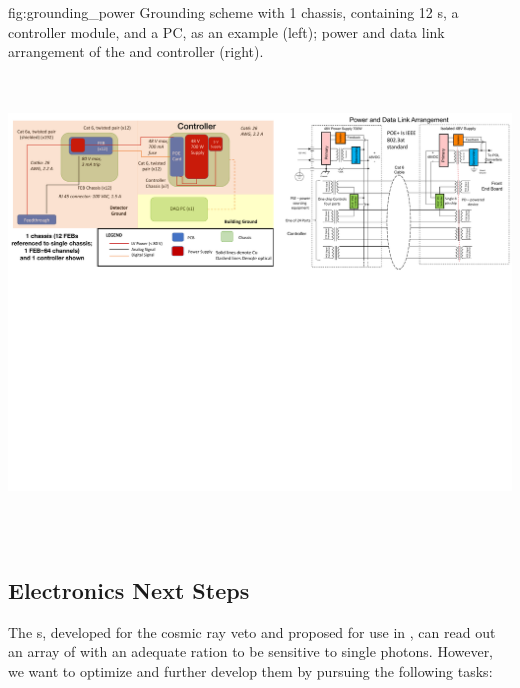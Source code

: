 \begin{dunefigure}
 {fig:grounding_power}
 {Grounding scheme with 1 chassis, containing 12 s, a controller module, and a  PC, as an example (left); power and data link arrangement of the  and controller (right).}
\includegraphics[height=5.0in]{graphics/pds-grounding-power.pdf} 
\vspace{-7.1cm}
\end{dunefigure}

\subsection{Electronics Next Steps}
\label{subsec:pds-fe-next}


The s, developed for the  cosmic ray veto and proposed for use in , can read out an array of  with an adequate  ration to be sensitive to single photons. However, we want to optimize and further develop them by pursuing the following tasks:

